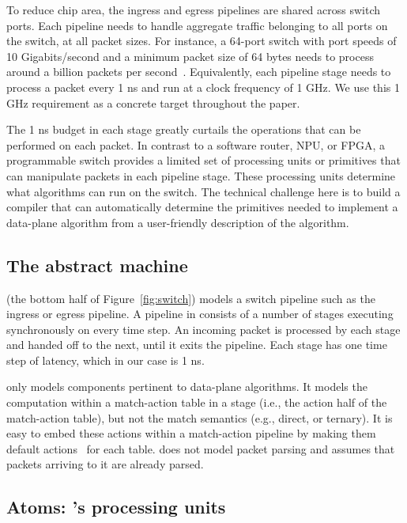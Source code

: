 To reduce chip area, the ingress and egress pipelines are shared across switch
ports.  Each pipeline needs to handle aggregate traffic belonging to all ports
on the switch, at all packet sizes. For instance, a 64-port switch with port
speeds of 10 Gigabits/second and a minimum packet size of 64 bytes needs to
process around a billion packets per second~\cite{rmt}.  Equivalently, each
pipeline stage needs to process a packet every 1 ns and run at a clock
frequency of 1 GHz. We use this 1 GHz requirement as a concrete target
throughout the paper.

The 1 ns budget in each stage greatly curtails the operations that can be
performed on each packet. In contrast to a software router, NPU, or FPGA, a
programmable switch provides a limited set of processing units or primitives
that can manipulate packets in each pipeline stage. These processing units
determine what algorithms can run on the switch. The technical challenge here
is to build a compiler that can automatically determine the primitives needed
to implement a data-plane algorithm from a user-friendly description of the
algorithm.

\subsection{The \absmachine abstract machine}

\absmachine (the bottom half of Figure~\ref{fig:switch}) models a switch
pipeline such as the ingress or egress pipeline. A pipeline in \absmachine
consists of a number of stages executing synchronously on every time step. An
incoming packet is processed by each stage and handed off to the next, until it
exits the pipeline. Each stage has one time step of latency, which in our case
is 1 ns.

\absmachine only models components pertinent to data-plane algorithms. It
models the computation within a match-action table in a stage (i.e., the action
half of the match-action table), but not the match semantics (e.g., direct, or
ternary). It is easy to embed these actions within a match-action pipeline by
making them default actions~\cite{p4spec} for each table. \absmachine does not
model packet parsing and assumes that packets arriving to it are already
parsed.

\subsection{Atoms: \absmachine's processing units}

